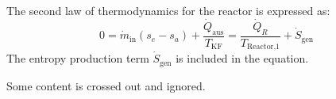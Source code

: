 The second law of thermodynamics for the reactor is expressed as:  
\[
0 = \dot{m}_{\text{in}} (s_e - s_a) + \frac{\dot{Q}_{\text{aus}}}{T_{\text{KF}}} = \frac{\dot{Q}_R}{T_{\text{Reactor,1}}} + \dot{S}_{\text{gen}}
\]  
The entropy production term \( \dot{S}_{\text{gen}} \) is included in the equation.  

Some content is crossed out and ignored.